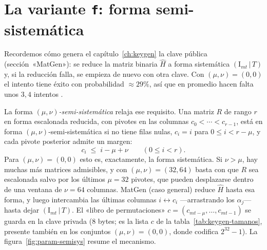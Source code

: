 \documentclass[11pt,a4paper,oneside]{report}
\begin{document}
\section{La variante \texttt{f}: forma semi-sistemática}\label{sec:param-f}

Recordemos cómo genera el capítulo~\ref{ch:keygen} la clave pública
(sección~«MatGen»): se reduce la matriz binaria $\hat H$ a forma
sistemática $(\mathrm{I}_{mt}\,|\,T)$ y, si la reducción falla, se
empieza de nuevo con otra clave. Con $(\mu,\nu)=(0,0)$ el intento
tiene éxito con probabilidad $\approx29\%$, así que en promedio hacen
falta unos $3{,}4$ intentos \cite{cmrationale}.

La forma \emph{$(\mu,\nu)$-semi-sistemática} relaja ese requisito. Una
matriz $R$ de rango $r$ en forma escalonada reducida, con pivotes en
las columnas $c_0<\cdots<c_{r-1}$, está en forma
$(\mu,\nu)$-semi-sistemática si no tiene filas nulas, $c_i=i$ para
$0\le i<r-\mu$, y cada pivote posterior admite un margen:
\[
  c_i\;\le\;i-\mu+\nu \qquad (0\le i<r).
\]
Para $(\mu,\nu)=(0,0)$ esto es, exactamente, la forma sistemática. Si
$\nu>\mu$, hay muchas más matrices admisibles, y con
$(\mu,\nu)=(32,64)$ basta con que $R$ sea escalonada salvo por los
últimos $\mu=32$ pivotes, que pueden desplazarse dentro de una ventana
de $\nu=64$ columnas. MatGen (caso general) reduce $\hat H$ hasta esa
forma, y luego intercambia las últimas columnas $i\leftrightarrow c_i$
---arrastrando los $\alpha_j$--- hasta dejar $(\mathrm{I}_{mt}\,|\,T)$.
El «libro de permutaciones» $c=(c_{mt-\mu},\dots,c_{mt-1})$ se guarda
en la clave privada (8 bytes; es la lista $c$ de la
tabla~\ref{tab:keygen-tamanos}, presente también en los conjuntos
$(\mu,\nu)=(0,0)$, donde codifica $2^{32}-1$).
La figura~\ref{fig:param-semisys} resume el mecanismo.
\end{document}
